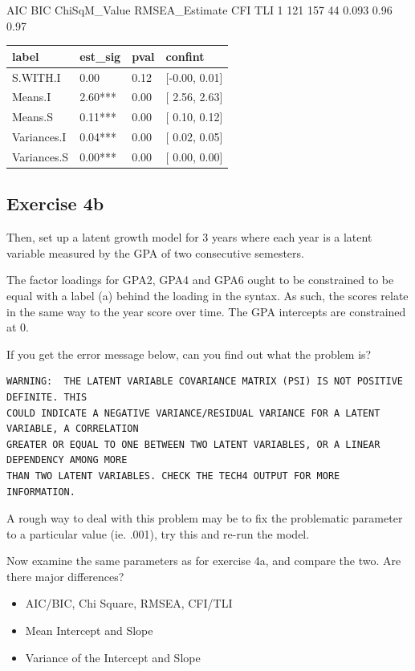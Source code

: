 \documentclass[
]{book}
\providecommand{\tightlist}{%
  \setlength{\itemsep}{0pt}\setlength{\parskip}{0pt}}
\begin{document}
AIC BIC ChiSqM\_Value RMSEA\_Estimate CFI TLI
1 121 157 44 0.093 0.96 0.97

\begin{tabular}[t]{l|l|l|l}
\hline
label & est\_sig & pval & confint\\
\hline
S.WITH.I & 0.00 & 0.12 & [-0.00,  0.01]\\
\hline
Means.I & 2.60*** & 0.00 & [ 2.56,  2.63]\\
\hline
Means.S & 0.11*** & 0.00 & [ 0.10,  0.12]\\
\hline
Variances.I & 0.04*** & 0.00 & [ 0.02,  0.05]\\
\hline
Variances.S & 0.00*** & 0.00 & [ 0.00,  0.00]\\
\hline
\end{tabular}

\hypertarget{exercise-4b}{%
\subsection{Exercise 4b}\label{exercise-4b}}

Then, set up a latent growth model for 3 years where each year is a latent variable measured by the GPA of two
consecutive semesters.

The factor loadings for GPA2, GPA4 and GPA6 ought to be constrained to be equal with a label (a) behind
the loading in the syntax. As such, the scores relate in the same way to the year score over time. The GPA
intercepts are constrained at 0.

If you get the error message below, can you find out what the problem is?

\begin{verbatim}
WARNING:  THE LATENT VARIABLE COVARIANCE MATRIX (PSI) IS NOT POSITIVE     DEFINITE. THIS 
COULD INDICATE A NEGATIVE VARIANCE/RESIDUAL VARIANCE FOR A LATENT VARIABLE, A CORRELATION 
GREATER OR EQUAL TO ONE BETWEEN TWO LATENT VARIABLES, OR A LINEAR DEPENDENCY AMONG MORE 
THAN TWO LATENT VARIABLES. CHECK THE TECH4 OUTPUT FOR MORE INFORMATION. 
\end{verbatim}

A rough way to deal with this problem may be to fix the problematic parameter to a particular value (ie. .001), try this and re-run the model.

Now examine the same parameters as for exercise 4a, and compare the two. Are there
major differences?

\begin{itemize}
\tightlist
\item
  AIC/BIC, Chi Square, RMSEA, CFI/TLI
\item
  Mean Intercept and Slope
\item
  Variance of the Intercept and Slope
\end{itemize}
\end{document}
